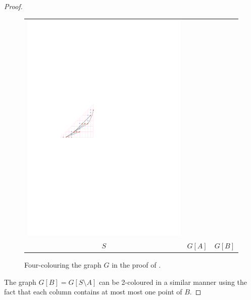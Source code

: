 \documentclass{patmorin}
\begin{document}
\begin{proof}
\begin{figure}
{\begin{tabular}{ccc}
         \includegraphics{figs/four-colouring-3} \\
         $S$ & $G[A]$ & $G[B]$
      \end{tabular}
      }
      \caption{Four-colouring the graph $G$ in the proof of 
               .}
   \end{figure}
   The graph $G[B] = G[S\setminus A]$ can be 2-coloured in a similar
   manner using the fact that each column contains at most most one
   point of $B$.


\end{proof}
\end{document}
